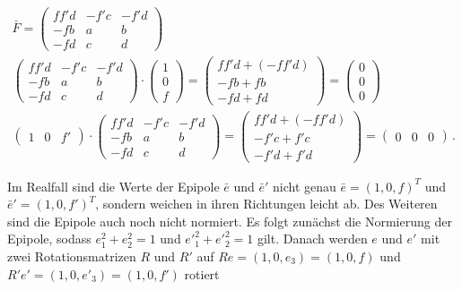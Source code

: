 


\begin{gather}
	\bar{F} = \begin{pmatrix}
	ff'd&-f'c&-f'd\\
	-fb&a&b\\
	-fd&c&d\label{eq:FSampson}
	\end{pmatrix}\\
	\begin{pmatrix}
	ff'd&-f'c&-f'd\\
	-fb&a&b\\
	-fd&c&d
	\end{pmatrix} \cdot \begin{pmatrix}
	1\\0\\f
	\end{pmatrix} = 
	\begin{pmatrix}
	ff'd + (-ff'd)\\
	-fb + fb\\
	-fd +fd
	\end{pmatrix}
	= 
	\begin{pmatrix}
	0\\0\\0
	\end{pmatrix}\\
	\begin{pmatrix}
	1&0&f'
	\end{pmatrix} \cdot
	\begin{pmatrix}
	ff'd&-f'c&-f'd\\
	-fb&a&b\\
	-fd&c&d
	\end{pmatrix} =
	\begin{pmatrix}
	ff'd + (-ff'd)\\
	-f'c + f'c\\
	-f'd + f'd
	\end{pmatrix} = 
		\begin{pmatrix}
	0&0&0
	\end{pmatrix} \, .
\end{gather}

Im Realfall sind die Werte der Epipole $\bar{e}$ und $\bar{e}'$ nicht genau $\bar{e} = (1,0,f)^T$ und $\bar{e}' = (1,0,f')^T$, sondern weichen in ihren Richtungen leicht ab. Des Weiteren sind die Epipole auch noch nicht normiert. Es folgt zunächst die Normierung der Epipole, sodass $e^2_1 + e^2_2 = 1$ und $e'^2_1 + e'^2_2 = 1$ gilt. Danach werden $e$ und $e'$ mit zwei Rotationsmatrizen $R$ und $R'$ auf $Re = (1,0,e_3) = (1,0,f)$ und $R'e' = (1,0,e'_3)=(1,0,f')$ rotiert

